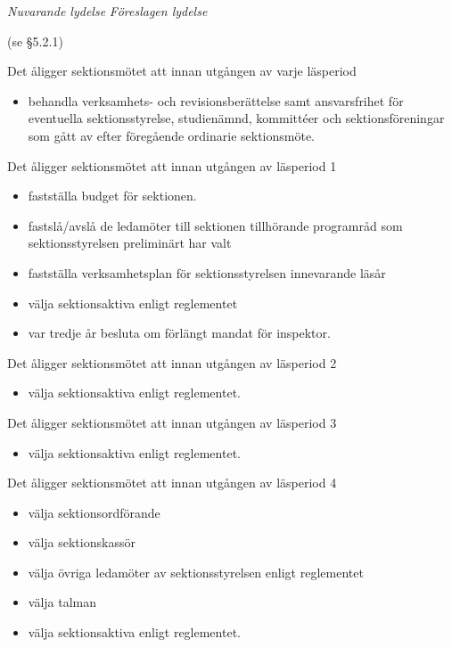 \documentclass{article}
\newenvironment{lydelse}
    {\begin{paracol}{2}%
        \emph{Nuvarande lydelse}%
        \switchcolumn%
        \emph{Föreslagen lydelse}%
    \end{paracol}%
    \begin{enumerate}[label=\thesubsection.\arabic*]%
    \begin{paracol}{2}%
    }{\end{paracol}\end{enumerate}}
\begin{document}
\begin{lydelse}
  \setcounter{subsection}{4}
  \item[] (se \S 5.2.1)

  \item Det åligger sektionsmötet att innan utgången av varje läsperiod
  \begin{itemize}
    \item behandla verksamhets- och revisionsberättelse samt ansvarsfrihet för eventuella sektionsstyrelse, studienämnd, kommittéer och sektionsföreningar som gått av efter föregående ordinarie sektionsmöte.
  \end{itemize}

    \item Det åligger sektionsmötet att innan utgången av läsperiod 1
    \begin{itemize}
    \item fastställa budget för sektionen.
    \item fastslå/avslå de ledamöter till sektionen tillhörande programråd som sektionsstyrelsen preliminärt har valt
    \item fastställa verksamhetsplan för sektionsstyrelsen innevarande läsår
    \item välja sektionsaktiva enligt reglementet
    \item var tredje år besluta om förlängt mandat för inspektor.
    \end{itemize}

  \item Det åligger sektionsmötet att innan utgången av läsperiod 2
    \begin{itemize}
    \item välja sektionsaktiva enligt reglementet.
    \end{itemize}

  \item Det åligger sektionsmötet att innan utgången av läsperiod 3
    \begin{itemize}
    \item välja sektionsaktiva enligt reglementet.
    \end{itemize}

  \item Det åligger sektionsmötet att innan utgången av läsperiod 4
    \begin{itemize}
    \item välja sektionsordförande
    \item välja sektionskassör
    \item välja övriga ledamöter av sektionsstyrelsen enligt reglementet
    \item välja talman
    \item välja sektionsaktiva enligt reglementet.
    \end{itemize}
  

\end{lydelse}
\end{document}
